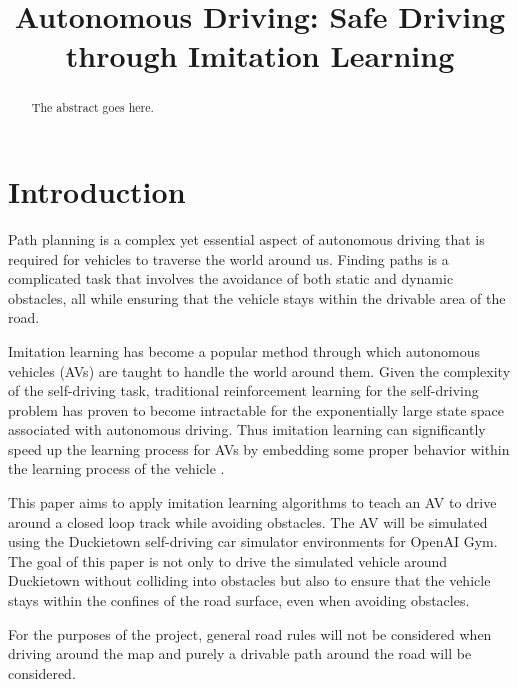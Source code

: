 \documentclass[conference]{IEEEtran}
\begin{document}
\title{Autonomous Driving: Safe Driving through Imitation Learning}

\author{
}


\maketitle

\begin{abstract}
The abstract goes here.
\end{abstract}

\IEEEpeerreviewmaketitle

\section{Introduction}
Path planning is a complex yet essential aspect of autonomous driving that is required
for vehicles to traverse the world around us. Finding paths is a complicated task that 
involves the avoidance of both static and dynamic obstacles, all while ensuring that the
vehicle stays within the drivable area of the road. \par
Imitation learning has become a popular method through which autonomous vehicles (AVs) are 
taught to handle the world around them. Given the complexity of the self-driving task,
traditional reinforcement learning for the self-driving problem has proven to become intractable
for the exponentially large state space associated with autonomous driving. Thus imitation learning
can significantly speed up the learning process for AVs by embedding some proper behavior within 
the learning process of the vehicle \cite{imitationLearning}. \par
This paper aims to apply imitation learning algorithms to teach an AV to drive around a closed loop
track while avoiding obstacles. The AV will be simulated using the Duckietown \cite{gym_duckietown} 
self-driving car simulator environments for OpenAI Gym. The goal of this paper is not only to
drive the simulated vehicle around Duckietown without colliding into obstacles but also to ensure
that the vehicle stays within the confines of the road surface, even when avoiding obstacles. \par
For the purposes of the project, general road rules will not be considered when driving
around the map and purely a drivable path around the road will be considered. 
\end{document}
